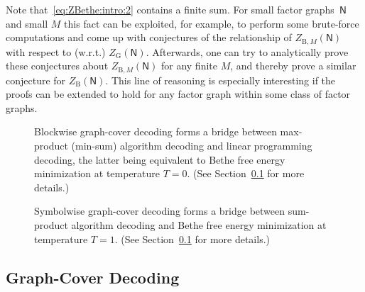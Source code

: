 \documentclass[journal, twocolumn]{IEEEtran}
\newcommand{\graph}[1]{\mathsf{#1}}
\newcommand{\graphN}{\graph{N}}
\newcommand{\ZBethe}{Z_{\mathrm{B}}}
\newcommand{\ZBetheM}[1]{Z_{\mathrm{B}, #1}}
\newcommand{\?}{\mathrm{?}}
\newcommand{\ZGibbs}{Z_{\mathrm{G}}}
\begin{document}
Note that~\eqref{eq:ZBethe:intro:2} contains a finite sum. For small factor
graphs~$\graphN$ and small $M$ this fact can be exploited, for example, to
perform some brute-force computations and come up with conjectures of the
relationship of $\ZBetheM{M}(\graphN)$ with respect to (w.r.t.)
$\ZGibbs(\graphN)$. Afterwards, one can try to analytically prove these
conjectures about $\ZBetheM{M}(\graphN)$ for any finite $M$, and thereby prove
a similar conjecture for $\ZBethe(\graphN)$. This line of reasoning is
especially interesting if the proofs can be extended to hold for any factor
graph within some class of factor graphs.


\begin{figure}
  \begin{flushright}
    \hspace{0.30cm}\mbox{}
  \end{flushright}
  \caption{Blockwise graph-cover decoding forms a bridge between max-product
    (min-sum) algorithm decoding and linear programming decoding, the latter
    being equivalent to Bethe free energy minimization at temperature $T =
    0$. (See Section~\ref{sec:introduction:graph:cover:decoding:1} for more
    details.)}
  \label{fig:BGCD:overview:1}
\end{figure}


\begin{figure}
  \begin{flushright}
    \hspace{0.30cm}\mbox{}
  \end{flushright}
  \caption{Symbolwise graph-cover decoding forms a bridge between sum-product
    algorithm decoding and Bethe free energy minimization at temperature $T =
    1$. (See Section~\ref{sec:introduction:graph:cover:decoding:1} for more
    details.)}
  \label{fig:SGCD:overview:1}
\end{figure}



\subsection{Graph-Cover Decoding}
\label{sec:introduction:graph:cover:decoding:1}
\end{document}
